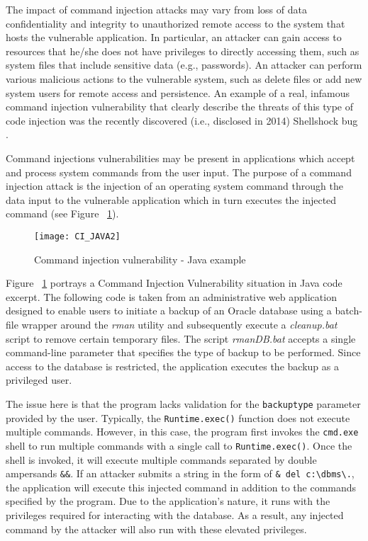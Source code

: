 The impact of command injection attacks may vary from loss of data confidentiality and integrity to unauthorized remote access to the system that hosts the vulnerable application. In particular, an attacker can gain access to resources that he/she does not have privileges to directly accessing them, such as system files that include sensitive data (e.g., passwords). An attacker can perform various malicious actions to the vulnerable system, such as delete files or add new system users for remote access and persistence. An example of a real, infamous command injection vulnerability that clearly describe the threats of this type of code injection was the recently discovered (i.e., disclosed in 2014) Shellshock bug \cite{Shellshock}.

Command injections vulnerabilities may be present in applications which accept and process system commands from the user input. The purpose of a command injection attack is the injection of an operating system command through the data input to the vulnerable application which in turn executes the injected command (see Figure ~\ref{fig:CIJAVA}). 

\begin{figure}[ht]
	\centering
	\texttt{[image: CI\_JAVA2]}
	  \caption{Command injection vulnerability - Java example}
  \label{fig:CIJAVA}
\end{figure}

Figure ~\ref{fig:CIJAVA} portrays a Command Injection Vulnerability situation in Java code excerpt. The following code is taken from an administrative web application designed to enable users to initiate a backup of an Oracle database using a batch-file wrapper around the \textit{rman} utility and subsequently execute a \textit{cleanup.bat} script to remove certain temporary files. The script \textit{rmanDB.bat} accepts a single command-line parameter that specifies the type of backup to be performed. Since access to the database is restricted, the application executes the backup as a privileged user.

The issue here is that the program lacks validation for the \texttt{backuptype} parameter provided by the user. Typically, the \texttt{Runtime.exec()} function does not execute multiple commands. However, in this case, the program first invokes the \texttt{cmd.exe} shell to run multiple commands with a single call to \texttt{Runtime.exec()}. Once the shell is invoked, it will execute multiple commands separated by double ampersands \texttt{\&\&}. If an attacker submits a string in the form of \texttt{\& del c:\textbackslash dbms\textbackslash .}, the application will execute this injected command in addition to the commands specified by the program. Due to the application's nature, it runs with the privileges required for interacting with the database. As a result, any injected command by the attacker will also run with these elevated privileges.

